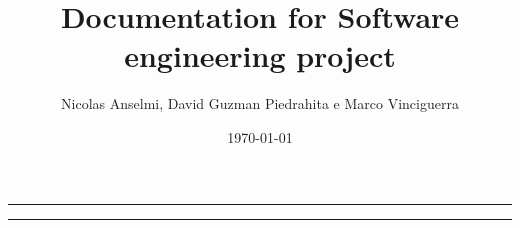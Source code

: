 \documentclass{article}
\title{Documentation for Software engineering project}
\author{Nicolas Anselmi, David Guzman Piedrahita e Marco Vinciguerra}
\date{\today}
\begin{document}
   

\par\noindent\rule{\textwidth}{0.4pt}
\par\noindent\rule{\textwidth}{0.4pt}
\end{document}
